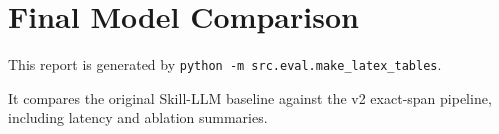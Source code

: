 \section{Final Model Comparison}

This report is generated by \texttt{python -m src.eval.make_latex_tables}.

It compares the original Skill-LLM baseline against the v2 exact-span pipeline, including latency and ablation summaries.
